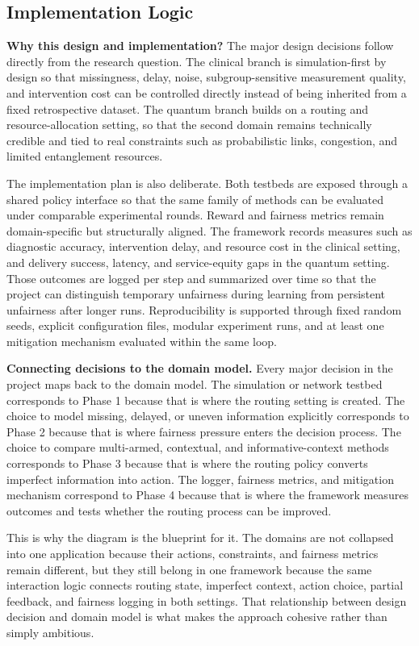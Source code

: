 \documentclass{IEEEtran}
\begin{document}
\subsection*{Implementation Logic}
\noindent\textbf{Why this design and implementation?} The major design decisions follow directly from the research question. The clinical branch is simulation-first by design so that missingness, delay, noise, subgroup-sensitive measurement quality, and intervention cost can be controlled directly instead of being inherited from a fixed retrospective dataset. The quantum branch builds on a routing and resource-allocation setting, so that the second domain remains technically credible and tied to real constraints such as probabilistic links, congestion, and limited entanglement resources.

The implementation plan is also deliberate. Both testbeds are exposed through a shared policy interface so that the same family of methods can be evaluated under comparable experimental rounds. Reward and fairness metrics remain domain-specific but structurally aligned. The framework records measures such as diagnostic accuracy, intervention delay, and resource cost in the clinical setting, and delivery success, latency, and service-equity gaps in the quantum setting. Those outcomes are logged per step and summarized over time so that the project can distinguish temporary unfairness during learning from persistent unfairness after longer runs. Reproducibility is supported through fixed random seeds, explicit configuration files, modular experiment runs, and at least one mitigation mechanism evaluated within the same loop.

\noindent\textbf{Connecting decisions to the domain model.} Every major decision in the project maps back to the domain model. The simulation or network testbed corresponds to Phase 1 because that is where the routing setting is created. The choice to model missing, delayed, or uneven information explicitly corresponds to Phase 2 because that is where fairness pressure enters the decision process. The choice to compare multi-armed, contextual, and informative-context methods corresponds to Phase 3 because that is where the routing policy converts imperfect information into action. The logger, fairness metrics, and mitigation mechanism correspond to Phase 4 because that is where the framework measures outcomes and tests whether the routing process can be improved.

This is why the diagram is the blueprint for it. The domains are not collapsed into one application because their actions, constraints, and fairness metrics remain different, but they still belong in one framework because the same interaction logic connects routing state, imperfect context, action choice, partial feedback, and fairness logging in both settings. That relationship between design decision and domain model is what makes the approach cohesive rather than simply ambitious.
\end{document}
